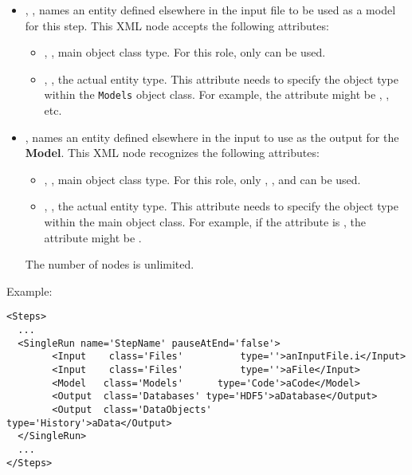\begin{itemize}
\item {}, , names an entity
defined elsewhere in the input file to be used as a model for this step.
This XML node accepts the following attributes:
\begin{itemize}
  \item {}, , main object class
    type.
    For this role, only  can be used.
  \item {}, , the actual entity
    type.
    This attribute needs to specify the object type within the \texttt{Models}
    object class.
    For example, the  attribute might be ,
    , etc.
\end{itemize}
\item {},  names an entity
defined elsewhere in the input to use as the output for the \textbf{Model}.
This XML node recognizes the following attributes:
\begin{itemize}
  \item {}, , main object class
    type.
    For this role, only , , and
     can be used.
  \item {}, , the actual entity
    type.
    This attribute needs to specify the object type within the main object
    class.
    For example, if the   attribute is , the
     attribute might be .
\end{itemize}
\nb The number of  nodes is unlimited.
\end{itemize}

Example:
\begin{lstlisting}[style=XML,morekeywords={class,pauseAtEnd}]
<Steps>
  ...
  <SingleRun name='StepName' pauseAtEnd='false'>
        <Input    class='Files'          type=''>anInputFile.i</Input>
        <Input    class='Files'          type=''>aFile</Input>
        <Model   class='Models'      type='Code'>aCode</Model>
        <Output  class='Databases' type='HDF5'>aDatabase</Output>
        <Output  class='DataObjects'        type='History'>aData</Output>
  </SingleRun>
  ...
</Steps>
\end{lstlisting}
